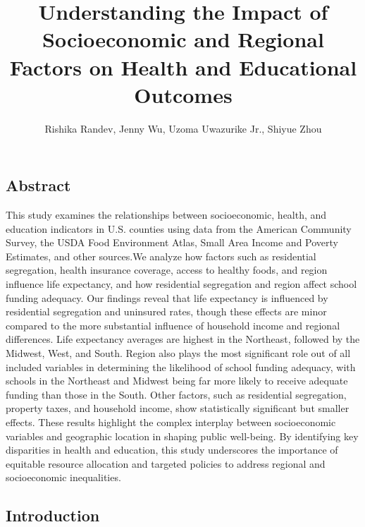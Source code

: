 \documentclass[
  10pt,
  letterpaper,
  DIV=11,
  numbers=noendperiod]{scrartcl}
\title{Understanding the Impact of Socioeconomic and Regional Factors on
Health and Educational Outcomes}
\author{Rishika Randev, Jenny Wu, Uzoma Uwazurike Jr., Shiyue Zhou}
\date{}
\begin{document}
\maketitle

\subsection{Abstract}\label{abstract}

This study examines the relationships between socioeconomic, health, and
education indicators in U.S. counties using data from the American
Community Survey, the USDA Food Environment Atlas, Small Area Income and
Poverty Estimates, and other sources.We analyze how factors such as
residential segregation, health insurance coverage, access to healthy
foods, and region influence life expectancy, and how residential
segregation and region affect school funding adequacy. Our findings
reveal that life expectancy is influenced by residential segregation and
uninsured rates, though these effects are minor compared to the more
substantial influence of household income and regional differences. Life
expectancy averages are highest in the Northeast, followed by the
Midwest, West, and South. Region also plays the most significant role
out of all included variables in determining the likelihood of school
funding adequacy, with schools in the Northeast and Midwest being far
more likely to receive adequate funding than those in the South. Other
factors, such as residential segregation, property taxes, and household
income, show statistically significant but smaller effects. These
results highlight the complex interplay between socioeconomic variables
and geographic location in shaping public well-being. By identifying key
disparities in health and education, this study underscores the
importance of equitable resource allocation and targeted policies to
address regional and socioeconomic inequalities.

\subsection{\texorpdfstring{\textbf{Introduction}}{Introduction}}\label{introduction}
\end{document}
